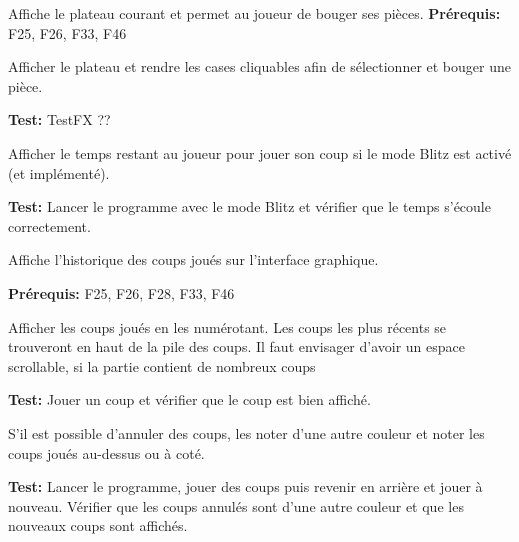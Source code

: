 \documentclass{article}
\begin{document}
\begin{needbox}
    Affiche le plateau courant et permet au joueur de bouger ses pièces.
    \textbf{Prérequis:} F25, F26, F33, F46
    \begin{subneedbox}
        Afficher le plateau et rendre les cases cliquables afin de sélectionner et 
        bouger une pièce.

        \textbf{Test:} TestFX ??
    \end{subneedbox}
    \begin{subneedbox}
        Afficher le temps restant au joueur pour jouer son coup si le mode Blitz est activé (et implémenté).

        \textbf{Test:} Lancer le programme avec le mode Blitz et vérifier que le temps s'écoule correctement.
    \end{subneedbox}
\end{needbox}

\begin{needbox}
    Affiche l'historique des coups joués sur l'interface graphique.

    \textbf{Prérequis:} F25, F26, F28, F33, F46
    \begin{subneedbox}
        Afficher les coups joués en les numérotant. Les coups les plus récents se trouveront
        en haut de la pile des coups. Il faut envisager d'avoir un espace scrollable, si la partie
        contient de nombreux coups

        \textbf{Test:} Jouer un coup et vérifier que le coup est bien affiché.
    \end{subneedbox}
    \begin{subneedbox}
        S'il est possible d'annuler des coups, les noter d'une autre couleur et noter les 
        coups joués au-dessus ou à coté.

        \textbf{Test:} Lancer le programme, jouer des coups puis revenir en arrière et jouer à nouveau.
        Vérifier que les coups annulés sont d'une autre couleur et que les nouveaux coups sont affichés.
    \end{subneedbox}
\end{needbox}
\end{document}
